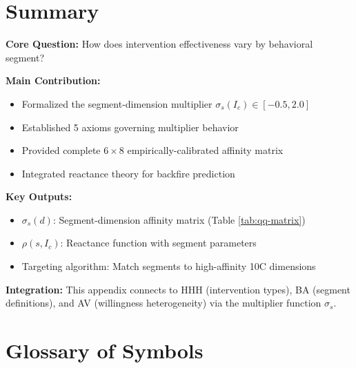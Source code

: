 
\section{Summary}
\label{sec:qq-summary}

\begin{tcolorbox}[colback=green!10!white, colframe=green!75!black,
    title=\textbf{Appendix QQ: Summary}]

\textbf{Core Question:} How does intervention effectiveness vary by behavioral segment?

\textbf{Main Contribution:}
\begin{itemize}[nosep]
    \item Formalized the segment-dimension multiplier $\sigma_s(I_c) \in [-0.5, 2.0]$
    \item Established 5 axioms governing multiplier behavior
    \item Provided complete $6 \times 8$ empirically-calibrated affinity matrix
    \item Integrated reactance theory for backfire prediction
\end{itemize}

\textbf{Key Outputs:}
\begin{itemize}[nosep]
    \item $\sigma_s(d)$: Segment-dimension affinity matrix (Table \ref{tab:qq-matrix})
    \item $\rho(s, I_c)$: Reactance function with segment parameters
    \item Targeting algorithm: Match segments to high-affinity 10C dimensions
\end{itemize}

\textbf{Integration:} This appendix connects to HHH (intervention types),
BA (segment definitions), and AV (willingness heterogeneity) via the
multiplier function $\sigma_s$.

\end{tcolorbox}


\section{Glossary of Symbols}
\label{sec:qq-glossary}

